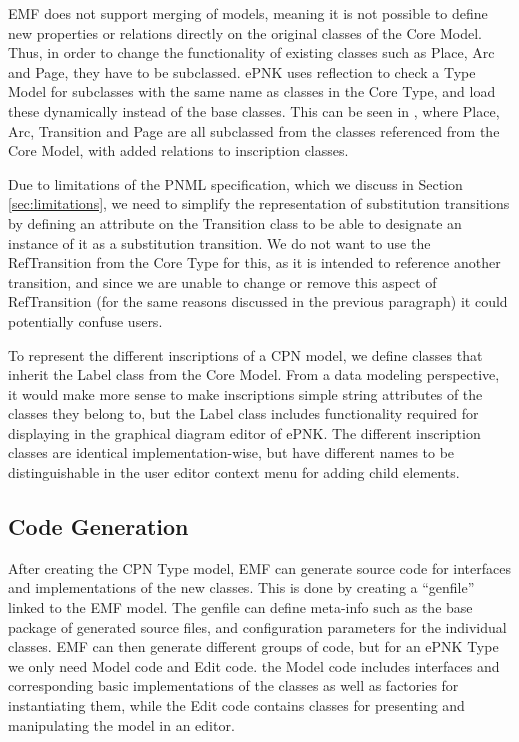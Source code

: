 EMF does not support merging of models, meaning it is not possible to define new
properties or relations directly on the original classes of the Core Model.
Thus, in order to change the functionality of existing classes such as Place,
Arc and Page, they have to be subclassed. ePNK uses reflection to check a
Type Model for subclasses with the same name as classes in the Core Type, and
load these dynamically instead of the base classes.
This can be seen in , where Place, Arc, Transition and
Page are all subclassed from the classes referenced from the Core Model, with
added relations to inscription classes.

Due to limitations of the PNML specification, which we discuss in Section
\ref{sec:limitations}, we need to simplify the representation of substitution
transitions by defining an attribute on the Transition class to be able to
designate an instance of it as a substitution transition. We do not want to use
the RefTransition from the Core Type for this, as it is intended to reference
another transition, and since we are unable to change or remove this aspect of
RefTransition (for the same reasons discussed in the previous paragraph) it
could potentially confuse users.

To represent the different inscriptions of a CPN model, we define classes that
inherit the Label class from the Core Model. From a data modeling
perspective, it would make more sense to make inscriptions simple
string attributes of the classes they belong to, but the Label class includes
functionality required for displaying in the graphical diagram editor of ePNK.
The different inscription classes are identical implementation-wise, but have
different names to be distinguishable in the user editor context menu for adding
child elements.

\subsection{Code Generation}
After creating the CPN Type model, EMF can generate source code for interfaces
and implementations of the new classes. This is done by creating a ``genfile''
linked to the EMF model. The genfile can define meta-info such as the base
package of generated source files, and configuration parameters for the
individual classes. EMF can then generate different groups of code, but for an
ePNK Type we only need Model code and Edit code. the Model code includes
interfaces and corresponding basic implementations of the classes as well as
factories for instantiating them, while the Edit code contains classes for
presenting and manipulating the model in an editor.

